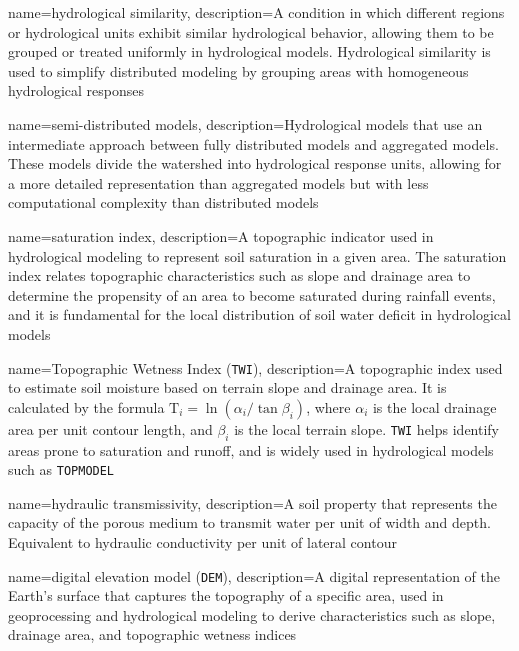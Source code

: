 {
    name=hydrological similarity,
    description={A condition in which different regions or hydrological units exhibit similar hydrological behavior, allowing them to be grouped or treated uniformly in hydrological models. Hydrological similarity is used to simplify distributed modeling by grouping areas with homogeneous hydrological responses}
}

{
    name=semi-distributed models,
    description={Hydrological models that use an intermediate approach between fully distributed models and aggregated models. These models divide the watershed into hydrological response units, allowing for a more detailed representation than aggregated models but with less computational complexity than distributed models}
}

{
    name=saturation index,
    description={A topographic indicator used in hydrological modeling to represent soil saturation in a given area. The saturation index relates topographic characteristics such as slope and drainage area to determine the propensity of an area to become saturated during rainfall events, and it is fundamental for the local distribution of soil water deficit in hydrological models}
}

{
    name=Topographic Wetness Index (\texttt{TWI}),
    description={A topographic index used to estimate soil moisture based on terrain slope and drainage area. It is calculated by the formula $\text{T}_i = \ln{(\alpha_{i}/\tan \beta_{i})}$, where $\alpha_{i}$ is the local drainage area per unit contour length, and $\beta_{i}$ is the local terrain slope. \texttt{TWI} helps identify areas prone to saturation and runoff, and is widely used in hydrological models such as \texttt{TOPMODEL}}
}

{
    name=hydraulic transmissivity,
    description={A soil property that represents the capacity of the porous medium to transmit water per unit of width and depth. Equivalent to hydraulic conductivity per unit of lateral contour}
}

{
    name=digital elevation model (\texttt{DEM}),
    description={A digital representation of the Earth's surface that captures the topography of a specific area, used in geoprocessing and hydrological modeling to derive characteristics such as slope, drainage area, and topographic wetness indices}
}

